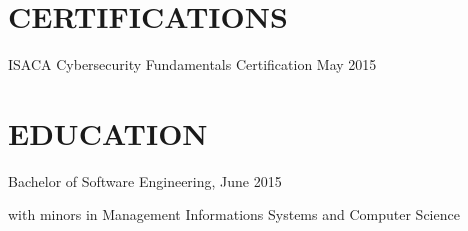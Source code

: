 \documentclass[]{dylan-resume}
\begin{document}
\begin{minipage}[t]{1.00\textwidth}

\section{CERTIFICATIONS}
\vspace{\topsep} %
\begin{tightemize}
\item ISACA Cybersecurity Fundamentals Certification \hspace*{\fill}May 2015
\end{tightemize}
\sectionsep

\section{EDUCATION}
\hspace*{\fill}
\begin{tightemize}
\item Bachelor of Software Engineering, \hspace*{\fill}June 2015 \par with minors in Management Informations Systems and Computer Science
\end{tightemize}
\sectionsep

\end{minipage}
\end{document}
